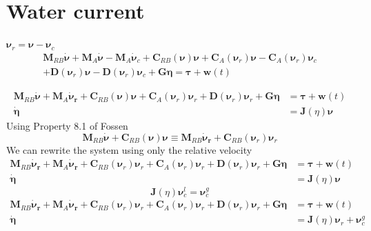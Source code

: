 \documentclass[12pt,a4]{article}
\begin{document}
\section{Water current}
$\bm{\nu}_r = \bm{\nu} - \bm{\nu}_c$
\begin{multline}
	\label{eq:standard_nu}
	\bm{M}_{RB}\bm{\dot{\nu}} + \bm{M}_{A}\bm{\dot{\nu}} - \bm{M}_{A}\bm{\dot{\nu}}_c + \bm{C}_{RB}(\bm{\nu})\bm{\nu}
	+ \bm{C}_{A}(\bm{\nu}_r)\bm{\nu} -  \bm{C}_{A}(\bm{\nu}_r)\bm{\nu}_c \\
	+ \bm{D}(\bm{\nu}_r) \bm{\nu} - \bm{D}(\bm{\nu}_r) \bm{\nu}_c  +\bm{G}\bm{\eta} = \bm{\tau} + \bm{w}(t)
\end{multline}


\begin{align}
	\bm{M}_{RB}\bm{\dot{\nu}} + \bm{M}_{A}\bm{\dot{\nu}_r} + \bm{C}_{RB}(\bm{\nu})\bm{\nu} + \bm{C}_{A}(\bm{\nu}_r)\bm{\nu}_r
	+ \bm{D}(\bm{\nu}_r)\bm{\nu}_r +\bm{G}\bm{\eta} & = \bm{\tau} + \bm{w}(t) \\
	\bm{\dot{\eta}}                                 & = \bm{J}(\eta)\bm{\nu}
\end{align}
Using Property 8.1 of Fossen
\begin{equation}
	\bm{M}_{RB}\bm{\dot{\nu}} + \bm{C}_{RB}(\bm{\nu})\bm{\nu} \equiv \bm{M}_{RB}\bm{\dot{\nu}_r} + \bm{C}_{RB}(\bm{\nu}_r)\bm{\nu}_r
\end{equation}
We can rewrite the system using only the relative velocity
\begin{align}
	\bm{M}_{RB}\bm{\dot{\nu}_r} + \bm{M}_{A}\bm{\dot{\nu}_r} + \bm{C}_{RB}(\bm{\nu}_r)\bm{\nu}_r + \bm{C}_{A}(\bm{\nu}_r)\bm{\nu}_r
	+ \bm{D}(\bm{\nu}_r)\bm{\nu}_r +\bm{G}\bm{\eta} & = \bm{\tau} + \bm{w}(t) \\
	\bm{\dot{\eta}}                                 & = \bm{J}(\eta)\bm{\nu}
\end{align}
\begin{equation}
	\bm{J}(\eta)\bm{\nu}_c^l = \bm{\nu}_c^g
\end{equation}
\begin{align}
	\bm{M}_{RB}\bm{\dot{\nu}_r} + \bm{M}_{A}\bm{\dot{\nu}_r} + \bm{C}_{RB}(\bm{\nu}_r)\bm{\nu}_r + \bm{C}_{A}(\bm{\nu}_r)\bm{\nu}_r
	+ \bm{D}(\bm{\nu}_r)\bm{\nu}_r +\bm{G}\bm{\eta} & = \bm{\tau} + \bm{w}(t)               \\
	\bm{\dot{\eta}}                                 & = \bm{J}(\eta)\bm{\nu}_r+\bm{\nu}_c^g
\end{align}
\end{document}
